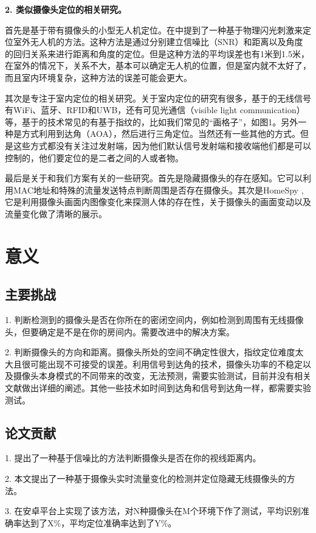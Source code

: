 \documentclass[UTF8]{ctexart}
\begin{document}
\textbf{2. 类似摄像头定位的相关研究。}

首先是基于带有摄像头的小型无人机定位。在\cite{DetecDr}中提到了一种基于物理闪光刺激来定位室外无人机的方法。这种方法是通过分别建立信噪比（SNR）和距离以及角度的回归关系来进行距离和角度的定位。但是这种方法的平均误差也有1米到1.5米，在室外的情况下，关系不大，基本可以确定无人机的位置，但是室内就不太好了，而且室内环境复杂，这种方法的误差可能会更大。

其次是专注于室内定位的相关研究。关于室内定位的研究有很多，基于的无线信号有WiFi、蓝牙、RFID和UWB，还有可见光通信（visible light communication）等，基于的技术常见的有基于指纹的，比如我们常见的“画格子”，如图1。另外一种是方式利用到达角（AOA），然后进行三角定位。当然还有一些其他的方式。但是这些方式都没有关注过发射端，因为他们默认信号发射端和接收端他们都是可以控制的，他们要定位的是二者之间的人或者物。

最后是关于和我们方案有关的一些研究。首先是隐藏摄像头的存在感知\cite{DeWiCam}。它可以利用MAC地址和特殊的流量发送特点判断周围是否存在摄像头。其次是HomeSpy \cite{HomeSpy},它是利用摄像头画面内图像变化来探测人体的存在性，关于摄像头的画面变动以及流量变化做了清晰的展示。

\section{意义}
\subsection{主要挑战}
1. 判断检测到的摄像头是否在你所在的密闭空间内，例如检测到周围有无线摄像头，但要确定是不是在你的房间内。需要改进\cite{DeWiCam}中的解决方案。

2. 判断摄像头的方向和距离。摄像头所处的空间不确定性很大，指纹定位难度太大且很可能出现不可接受的误差。利用信号到达角的技术，摄像头功率的不稳定以及摄像头本身模式的不同带来的改变，无法预测，需要实验测试，目前并没有相关文献做出详细的阐述。其他一些技术如时间到达角和信号到达角一样，都需要实验测试。

\subsection{论文贡献}
1. 提出了一种基于信噪比的方法判断摄像头是否在你的视线距离内。

2. 本文提出了一种基于摄像头实时流量变化的检测并定位隐藏无线摄像头的方法。

3. 在安卓平台上实现了该方法，对N种摄像头在M个环境下作了测试，平均识别准确率达到了X\%，平均定位准确率达到了Y\%。
\end{document}
